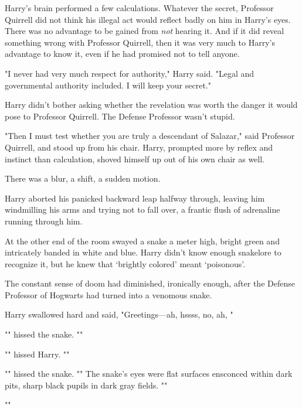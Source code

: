 Harry's brain performed a few calculations. Whatever the secret, Professor 
Quirrell did not think his illegal act would reflect badly on him in Harry's 
eyes. There was no advantage to be gained from \emph{not} hearing it. And if it 
did reveal something wrong with Professor Quirrell, then it was very much to 
Harry's advantage to know it, even if he had promised not to tell anyone.

"I never had very much respect for authority," Harry said. "Legal and 
governmental authority included. I will keep your secret."

Harry didn't bother asking whether the revelation was worth the danger it would 
pose to Professor Quirrell. The Defense Professor wasn't stupid.

"Then I must test whether you are truly a descendant of Salazar," said 
Professor Quirrell, and stood up from his chair. Harry, prompted more by reflex 
and instinct than calculation, shoved himself up out of his own chair as well.

There was a blur, a shift, a sudden motion.

Harry aborted his panicked backward leap halfway through, leaving him 
windmilling his arms and trying not to fall over, a frantic flush of adrenaline 
running through him.

At the other end of the room swayed a snake a meter high, bright green and 
intricately banded in white and blue. Harry didn't know enough snakelore to 
recognize it, but he knew that `brightly colored' meant `poisonous'.

The constant sense of doom had diminished, ironically enough, after the Defense 
Professor of Hogwarts had turned into a venomous snake.

Harry swallowed hard and said, "Greetings---ah, hssss, no, ah, 
"

"" hissed the snake. ""

"" hissed Harry. ""

"" hissed the snake. "" The snake's eyes were flat surfaces ensconced within dark pits, sharp 
black pupils in dark gray fields. ""

""

